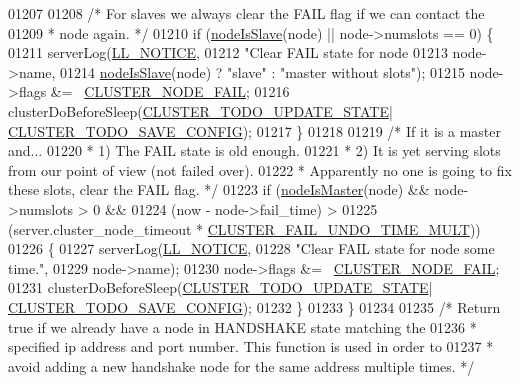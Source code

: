 \begin{DoxyCode}
{{{{{{{{{{{{{{{{01207 
01208     \textcolor{comment}{/* For slaves we always clear the FAIL flag if we can contact the}
01209 \textcolor{comment}{     * node again. */}
01210     \textcolor{keywordflow}{if} (\hyperlink{cluster_8h_a3c99881f6892130c902b42b1f84a0e11}{nodeIsSlave}(node) || node->numslots == 0) \{
01211         serverLog(\hyperlink{server_8h_a8c54c191e436c7dd3012167212692401}{LL\_NOTICE},
01212             \textcolor{stringliteral}{"Clear FAIL state for node %
01213                 node->name,
01214                 \hyperlink{cluster_8h_a3c99881f6892130c902b42b1f84a0e11}{nodeIsSlave}(node) ? \textcolor{stringliteral}{"slave"} : \textcolor{stringliteral}{"master without slots"});
01215         node->flags &= ~\hyperlink{cluster_8h_ad211e85c7baf8a5a59acd747e4e9005a}{CLUSTER\_NODE\_FAIL};
01216         clusterDoBeforeSleep(\hyperlink{cluster_8h_abea0d393cba342261e4a7e6fb745f388}{CLUSTER\_TODO\_UPDATE\_STATE}|
      \hyperlink{cluster_8h_a0ae5ff08fbae3c655012b4de8bfc327d}{CLUSTER\_TODO\_SAVE\_CONFIG});
01217     \}
01218 
01219     \textcolor{comment}{/* If it is a master and...}
01220 \textcolor{comment}{     * 1) The FAIL state is old enough.}
01221 \textcolor{comment}{     * 2) It is yet serving slots from our point of view (not failed over).}
01222 \textcolor{comment}{     * Apparently no one is going to fix these slots, clear the FAIL flag. */}
01223     \textcolor{keywordflow}{if} (\hyperlink{cluster_8h_a2d8e84269474d8750565fb3fb67aa436}{nodeIsMaster}(node) && node->numslots > 0 &&
01224         (now - node->fail\_time) >
01225         (server.cluster\_node\_timeout * \hyperlink{cluster_8h_a91dcc2950ab29bc6fa0706069bd64e35}{CLUSTER\_FAIL\_UNDO\_TIME\_MULT}))
01226     \{
01227         serverLog(\hyperlink{server_8h_a8c54c191e436c7dd3012167212692401}{LL\_NOTICE},
01228             \textcolor{stringliteral}{"Clear FAIL state for node %
       some time."},
01229                 node->name);
01230         node->flags &= ~\hyperlink{cluster_8h_ad211e85c7baf8a5a59acd747e4e9005a}{CLUSTER\_NODE\_FAIL};
01231         clusterDoBeforeSleep(\hyperlink{cluster_8h_abea0d393cba342261e4a7e6fb745f388}{CLUSTER\_TODO\_UPDATE\_STATE}|
      \hyperlink{cluster_8h_a0ae5ff08fbae3c655012b4de8bfc327d}{CLUSTER\_TODO\_SAVE\_CONFIG});
01232     \}
01233 \}
01234 
01235 \textcolor{comment}{/* Return true if we already have a node in HANDSHAKE state matching the}
01236 \textcolor{comment}{ * specified ip address and port number. This function is used in order to}
01237 \textcolor{comment}{ * avoid adding a new handshake node for the same address multiple times. */}
}}}}}}}}}}}}}}}}}
\end{DoxyCode}
